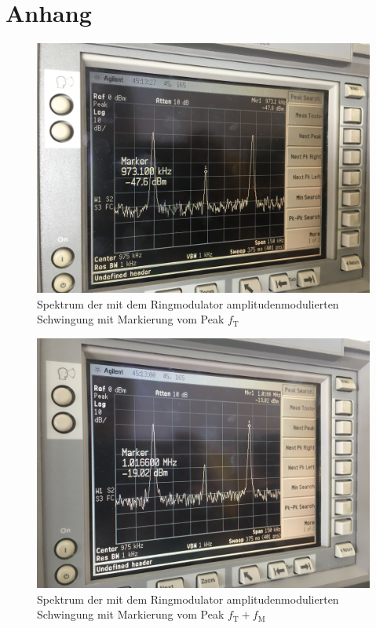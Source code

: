 \appendix
\section{Anhang}
\begin{figure}[h]
  \centering
  \includegraphics[width=.7\textwidth]{Spektrum_Pics/b2.jpg}
  \caption{Spektrum der mit dem Ringmodulator amplitudenmodulierten Schwingung mit Markierung vom Peak $f_\text{T}$}
  \label{fig:b2}
\end{figure}
\begin{figure}[h]
  \centering
  \includegraphics[width=.7\textwidth]{Spektrum_Pics/b3.jpg}
  \caption{Spektrum der mit dem Ringmodulator amplitudenmodulierten Schwingung mit Markierung vom Peak $f_\text{T} + f_\text{M}$}
  \label{fig:b3}
\end{figure}
